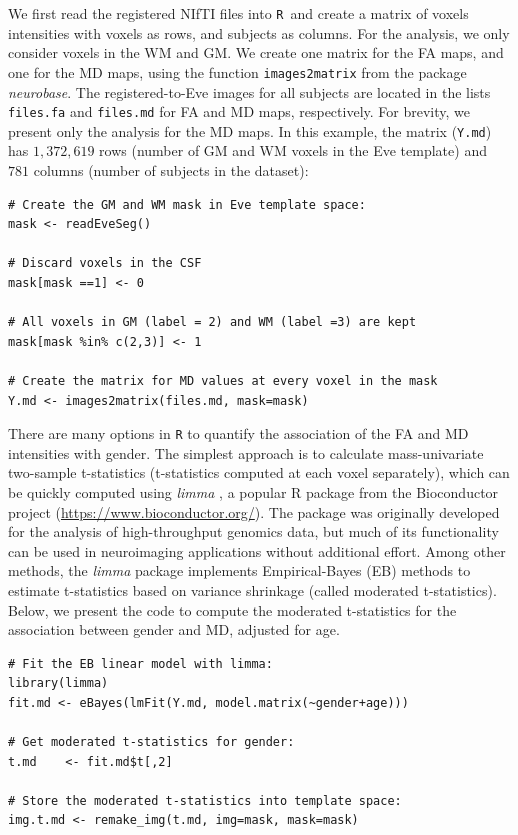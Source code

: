\documentclass[]{elsarticle} %
\newcommand{\code}[1]{\texttt{#1}}
\newcommand{\pkg}[1]{\emph{#1}}
\newcommand{\rlang}{\texttt{R}}
\begin{document}
We first read the registered NIfTI files into \rlang~and create a matrix of voxels intensities with voxels as rows, and subjects as columns. For the analysis, we only consider voxels in the WM and GM. We create one matrix for the FA maps, and one for the MD maps, using the function \code{images2matrix} from the package \pkg{neurobase}. The registered-to-Eve images for all subjects are located in the lists \code{files.fa} and \code{files.md} for FA and MD maps, respectively. For brevity, we present only the analysis for the MD maps.  In this example, the matrix (\code{Y.md}) has $1,372,619$ rows (number of GM and WM voxels in the Eve template) and $781$ columns (number of subjects in the dataset):
\color{blue}
\begin{verbatim}
# Create the GM and WM mask in Eve template space:
mask <- readEveSeg()

# Discard voxels in the CSF
mask[mask ==1] <- 0 

# All voxels in GM (label = 2) and WM (label =3) are kept
mask[mask %in% c(2,3)] <- 1

# Create the matrix for MD values at every voxel in the mask
Y.md <- images2matrix(files.md, mask=mask)
\end{verbatim}
\color{black}


There are many options in {\rlang} to quantify the association of the FA and MD intensities with gender. The simplest approach is to calculate mass-univariate two-sample t-statistics (t-statistics computed at each voxel separately), which can be quickly computed using \pkg{limma} \citep{limma1,limma2, limma3}, a popular R package from the Bioconductor project (\url{https://www.bioconductor.org/}). The package was originally developed for the analysis of high-throughput genomics data, but much of its functionality can be used in neuroimaging applications without additional effort. Among other methods, the \pkg{limma} package implements Empirical-Bayes (EB) methods to estimate t-statistics based on variance shrinkage (called moderated t-statistics). Below, we present the code to compute the moderated t-statistics for the association between gender and MD, adjusted for age. 

\color{blue}
\begin{verbatim}
# Fit the EB linear model with limma:
library(limma)
fit.md <- eBayes(lmFit(Y.md, model.matrix(~gender+age)))

# Get moderated t-statistics for gender:
t.md    <- fit.md$t[,2]

# Store the moderated t-statistics into template space:
img.t.md <- remake_img(t.md, img=mask, mask=mask)
\end{verbatim}
\color{black}
\end{document}
